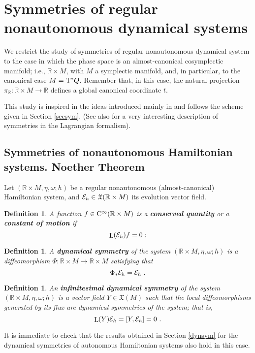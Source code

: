 \documentclass[12pt]{report}
\newtheorem{definition}[teor]{Definition}
\def\vf{\mathfrak X}
\def\Real{\mathbb{R}}
\def\Tan{{\rm T}}
\def\Lie{\mathop{\rm L}\nolimits}
\def\Cinfty{{\rm C}^\infty}
\begin{document}
\section{Symmetries of regular nonautonomous dynamical systems}


We restrict the study of symmetries of regular nonautonomous dynamical system
to the case in which the phase space is an
almost-canonical cosymplectic manifold; i.e., $\Real\times M$,
with $M$ a symplectic manifold, and, in particular, to the canonical case
$M=\Tan^*Q$.
Remember that, in this case, the natural projection
$\pi_\Real\colon\Real\times M\to\Real$ defines
a global canonical coordinate $t$.

This study is inspired in the ideas introduced mainly in \cite{albert} and follows
the scheme given in Section \ref{secsym}.
(See also \cite{SC-81} for a very interesting description of symmetries in the Lagrangian formalism).


\subsection{Symmetries of nonautonomous Hamiltonian systems. Noether Theorem}


Let $(\Real\times M,\eta,\omega;h)$ be a regular nonautonomous (almost-canonical) Hamiltonian system, and ${\cal E}_h\in\vf(\Real\times M)$
its evolution vector field.

\begin{definition}
A function $f \in \Cinfty (\Real\times M)$ is a \textbf{conserved quantity}
or a \textbf{constant of motion} if
$$
\Lie ({\cal E}_h) f = 0 \ ;
$$
\end{definition}

 \begin{definition}
A \textbf{dynamical symmetry} of the system $(\Real\times M,\eta,\omega;h)$
 is a diffeomorphism $\Phi\colon\Real\times M \to\Real\times M$ satisfying that
$$
\Phi_*{\cal E}_h={\cal E}_h \ .
$$
\end{definition}

\begin{definition}
An \textbf{infinitesimal dynamical symmetry} of the system $(\Real\times M,\eta,\omega;h)$
is a vector field $Y\in\vf(M)$ such that  
the local diffeomorphisms  generated by its flux
are dynamical symmetries of the system; that is,
$$
\Lie(Y){\cal E}_h=[Y,{\cal E}_h]=0 \ .
$$
 \end{definition}

It is immediate to check that the results obtained in Section \ref{dynsym}
for the dynamical symmetries of autonomous Hamiltonian systems also hold in this case.
\end{document}
